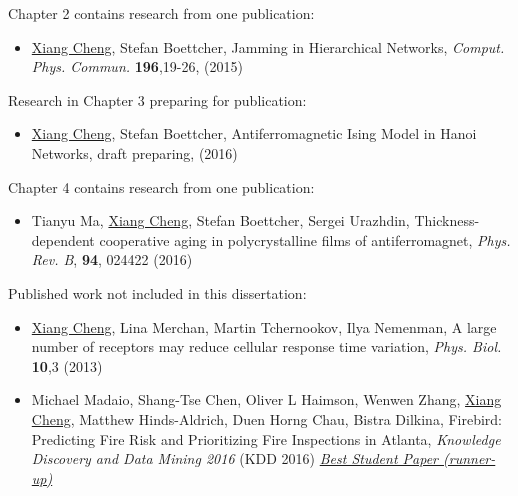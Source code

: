 \begin{prev_citation}
\noindent Chapter 2 contains research from one publication:
\begin{itemize}
\item \underline{Xiang Cheng}, Stefan Boettcher, Jamming in Hierarchical Networks, {\it Comput. Phys. Commun.} {\bf 196},19-26, (2015)
\end{itemize}

\noindent Research in Chapter 3 preparing for publication:
\begin{itemize}
\item \underline{Xiang Cheng}, Stefan Boettcher, Antiferromagnetic Ising Model in Hanoi Networks, draft preparing, (2016)
\end{itemize}

\noindent Chapter 4 contains research from one publication:
\begin{itemize}
\item  Tianyu Ma, \underline{Xiang Cheng}, Stefan Boettcher, Sergei Urazhdin, Thickness-dependent cooperative aging in polycrystalline films of antiferromagnet, {\it Phys. Rev. B},   {\bf 94}, 024422 (2016)
\end{itemize}


\noindent Published work not included in this dissertation:
\begin{itemize}
\item  \underline{Xiang Cheng}, Lina Merchan, Martin Tchernookov, Ilya Nemenman, A large number of receptors may reduce cellular response time variation, {\it Phys. Biol.}  {\bf 10},3 (2013)

\item  Michael Madaio, Shang-Tse Chen, Oliver L Haimson, Wenwen Zhang, \underline{Xiang Cheng}, Matthew Hinds-Aldrich, Duen Horng Chau, Bistra Dilkina, Firebird: Predicting Fire Risk and Prioritizing Fire Inspections in Atlanta, {\it  Knowledge Discovery and Data Mining 2016} (KDD 2016) \underline{\it Best Student Paper (runner-up)}
\end{itemize}

\end{prev_citation}

\pagestyle{fancy}
